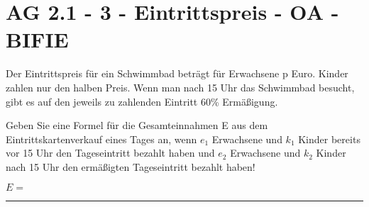 \section{AG 2.1 - 3 - Eintrittspreis - OA - BIFIE}

\begin{beispiel}[AG 2.1]{1} %
	Der Eintrittspreis für ein Schwimmbad beträgt für Erwachsene p Euro. Kinder zahlen nur den halben Preis. Wenn man nach 15 Uhr das Schwimmbad besucht, gibt es auf den jeweils zu
zahlenden Eintritt 60\% Ermäßigung. 	
\leer

Geben Sie eine Formel für die Gesamteinnahmen E aus dem Eintrittskartenverkauf eines Tages an, wenn $e_1$ Erwachsene und $k_1$ Kinder bereits vor 15 Uhr den Tageseintritt bezahlt haben und $e_2$ Erwachsene und $k_2$ Kinder nach 15 Uhr den ermäßigten Tageseintritt bezahlt haben!
\leer

$E=$ \rule{7cm}{0.5pt}

\end{beispiel}
